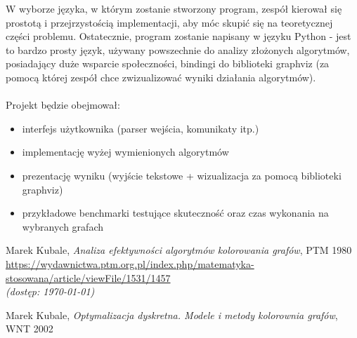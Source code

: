 \documentclass[10pt,a4paper]{article}
\begin{document}
	W wyborze języka, w którym zostanie stworzony program, zespół kierował się prostotą i przejrzystością implementacji, aby móc skupić się na teoretycznej części problemu. Ostatecznie, program zostanie napisany w języku Python - jest to bardzo prosty język, używany powszechnie do analizy złożonych algorytmów, posiadający duże wsparcie społeczności, bindingi do biblioteki graphviz (za pomocą której zespół chce zwizualizować wyniki działania algorytmów).
	\\~\\
	Projekt będzie obejmował:
	\begin{itemize}
		\item interfejs użytkownika (parser wejścia, komunikaty itp.)
		\item implementację wyżej wymienionych algorytmów 
		\item prezentację wyniku (wyjście tekstowe + wizualizacja za pomocą biblioteki graphviz)
		\item przykładowe benchmarki testujące skuteczność oraz czas wykonania na wybranych grafach
	\end{itemize}

	\vfill
	
	\begin{thebibliography}{0}
		Marek Kubale, \textit{Analiza efektywności algorytmów kolorowania grafów}, PTM 1980\\
		\url{https://wydawnictwa.ptm.org.pl/index.php/matematyka-stosowana/article/viewFile/1531/1457}\\
		\textit{(dostęp: \today)}
		
		Marek Kubale, \textit{Optymalizacja dyskretna. Modele i metody kolorownia grafów}, WNT 2002
	\end{thebibliography}
	
\end{document}
